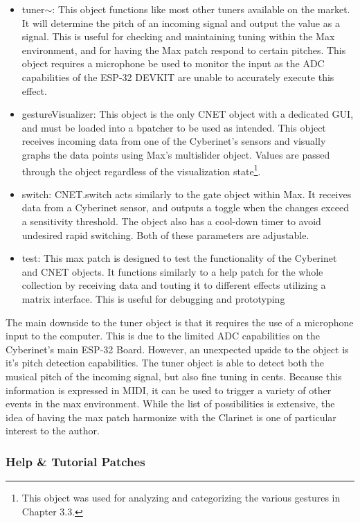 \begin{itemize}
    \item  tuner$\sim$: This object functions like most other tuners available on the market. It will determine the pitch of an incoming signal and output the value as a signal. This is useful for checking and maintaining tuning within the Max environment, and for having the Max patch respond to certain pitches. This object requires a microphone be used to monitor the input as the ADC capabilities of the ESP-32 DEVKIT are unable to accurately execute this effect.
    \item gestureVisualizer: This object is the only CNET object with a dedicated GUI, and must be loaded into a bpatcher to be used as intended. This object receives incoming data from one of the Cyberinet's sensors and visually graphs the data points using Max's multislider object. Values are passed through the object regardless of the visualization state\footnote{This object was used for analyzing and categorizing the various gestures in Chapter 3.3.}.
    \item switch: CNET.switch acts similarly to the gate object within Max. It receives data from a Cyberinet sensor, and outputs a toggle when the changes exceed a sensitivity threshold. The object also has a cool-down timer to avoid undesired rapid switching. Both of these parameters are adjustable.
    \item test: This max patch is designed to test the functionality of the Cyberinet and CNET objects. It functions similarly to a help patch for the whole collection by receiving data and touting it to different effects utilizing a matrix interface. This is useful for debugging and prototyping
\end{itemize}


The main downside to the tuner object is that it requires the use of a microphone input to the computer. This is due to the limited ADC capabilities on the Cyberinet's main ESP-32 Board. However, an unexpected upside to the object is it's pitch detection capabilities. The tuner object is able to detect both the musical pitch of the incoming signal, but also fine tuning in cents. Because this information is expressed in MIDI, it can be used to trigger a variety of other events in the max environment. While the list of possibilities is extensive, the idea of having the max patch harmonize with the Clarinet is one of particular interest to the author.

\subsubsection{Help \& Tutorial Patches}

